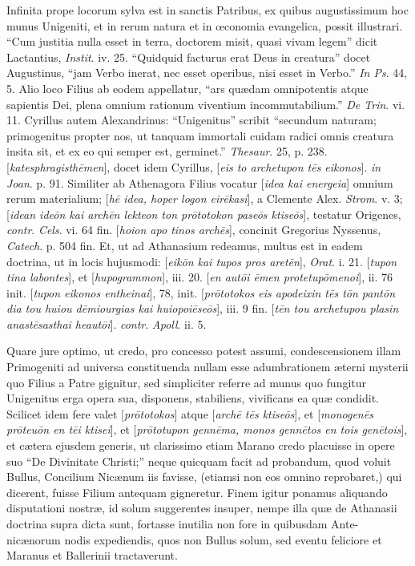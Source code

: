 Infinita
prope locorum sylva est in sanctis Patribus, ex quibus augustissimum
hoc munus Unigeniti, et in rerum natura et in œconomia evangelica,
possit illustrari. ``Cum justitia nulla esset in terra, doctorem
misit, quasi vivam legem'' dicit Lactantius, \emph{Instit}. iv. 25. ``Quidquid facturus erat Deus in creatura'' docet
Augustinus, ``jam
Verbo inerat, nec esset operibus, nisi esset in Verbo.'' \emph{In Ps}.
44, 5. Alio loco Filius ab eodem appellatur, ``ars quædam
omnipotentis atque sapientis Dei, plena omnium rationum viventium
incommutabilium.'' \emph{De Trin}. vi. 11. Cyrillus autem Alexandrinus:
``Unigenitus'' scribit ``secundum naturam;
primogenitus propter nos, ut tanquam immortali cuidam radici omnis
creatura insita sit, et ex eo qui semper est, germinet.'' \emph{Thesaur}.
25, p. 238. [\emph{katesphragisth\={e}men}], docet idem Cyrillus, [\emph{eis
to archetupon t\={e}s eikonos}]. \emph{in Joan}. p. 91.
Similiter ab Athenagora Filius vocatur [\emph{idea kai energeia}]
omnium rerum materialium; [\emph{h\={e} idea, hoper logon eir\={e}kasi}],
a Clemente Alex. \emph{Strom}. v. 3; [\emph{idean ide\={o}n kai arch\={e}n
lekteon ton pr\={o}totokon pase\={o}s ktise\={o}s}],
testatur Origenes, \emph{contr}. \emph{Cels}. vi. 64 fin. [\emph{hoion
apo tinos arch\={e}s}], concinit Gregorius Nyssenus, \emph{Catech}.
p. 504 fin. Et, ut ad Athanasium redeamus, multus est in eadem
doctrina, ut in locis hujusmodi: [\emph{eik\={o}n kai tupos pros aret\={e}n}],
\emph{Orat}. i. 21. [\emph{tupon tina labontes}], et [\emph{hupogrammon}],
iii. 20. [\emph{en aut\={o}i \={e}men protetup\={o}menoi}],
ii. 76 init. [\emph{tupon eikonos entheinai}], 78, init. [\emph{pr\={o}totokos
eis apodeixin t\={e}s t\={o}n pant\={o}n dia tou huiou d\={e}miourgias
kai huiopoi\={e}se\={o}s}], iii. 9 fin. [\emph{t\={e}n tou
archetupou plasin anast\={e}sasthai heaut\={o}i}]. \emph{contr}.
\emph{Apoll}. ii. 5.

Quare jure
optimo, ut credo, pro concesso potest assumi, condescensionem illam
Primogeniti ad universa constituenda nullam esse adumbrationem æterni
mysterii quo Filius a Patre gignitur, sed simpliciter referre ad munus quo fungitur Unigenitus erga opera sua, disponens, stabiliens,
vivificans ea quæ condidit. Scilicet idem fere valet [\emph{pr\={o}totokos}]
atque [\emph{arch\={e} t\={e}s ktise\={o}s}], et [\emph{monogen\={e}s
pr\={o}teu\={o}n en t\={e}i ktisei}], et [\emph{pr\={o}totupon
genn\={e}ma, monos genn\={e}tos en tois gen\={e}tois}], et
cætera ejusdem generis, ut clarissimo etiam Marano credo placuisse in
opere suo ``De Divinitate Christi;'' neque quicquam facit ad
probandum, quod voluit Bullus, Concilium Nicænum iis favisse, (etiamsi
non eos omnino reprobaret,) qui dicerent, fuisse Filium antequam
gigneretur. Finem igitur ponamus aliquando disputationi nostræ, id
solum suggerentes insuper, nempe illa quæ de Athanasii doctrina supra
dicta sunt, fortasse inutilia non fore in quibusdam Ante-nicænorum
nodis expediendis, quos non Bullus solum, sed eventu feliciore et
Maranus et Ballerinii tractaverunt.

